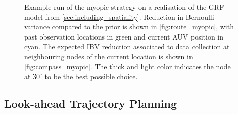 \documentclass[aoas,preprint]{imsart}
\begin{document}
\begin{figure}[ht] 
\centering 
{}
\hspace{2em}
\hspace{2em}
\caption{Example run of the myopic strategy on a realisation of the GRF
model from \ref{sec:including_spatiality}. Reduction in Bernoulli variance
compared to the prior is shown in \ref{fig:route_myopic}, with past observation
locations in green and current AUV position in cyan. The expected IBV reduction
associated to data collection at neighbouring nodes of the current location is
shown in \ref{fig:compass_myopic}. The thick and light color indicates the node at $30 ^{\circ}$ to be the best possible choice.}
\label{fig:ebv_myopic}
\end{figure}





\subsection{Look-ahead Trajectory Planning}
\label{sec:LA}
\end{document}
